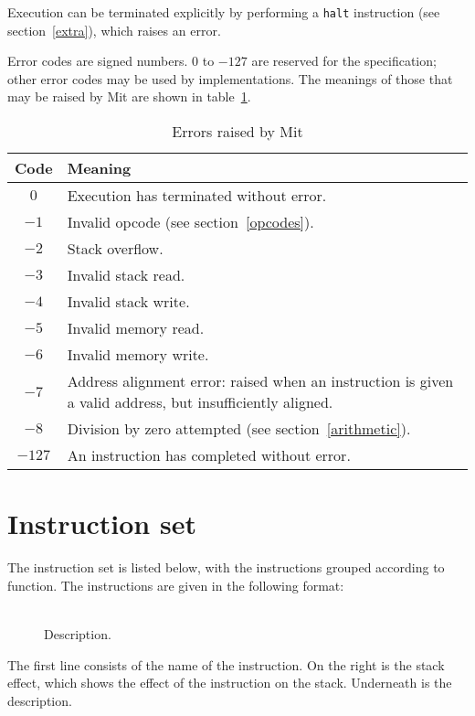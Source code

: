 \documentclass[a4paper]{article}
\newcommand{\spic}[1]{\texttt{\textsl{#1\/}}}
\newlength{\itemwidth}\itemwidth=\textwidth \advance\itemwidth by -0.1in
\newlength{\instname}\instname=1.5in
\newlength{\stackcom}\stackcom=3.0in
\newcommand{\inst}[3]{\item[]\parbox{\itemwidth}%
{\makebox[\instname][l]{\tt #1}%
\makebox[\stackcom][r]{\tt ( \spic{#2} )}\\[0.5ex]#3}}
\begin{document}
Execution can be terminated explicitly by performing a {\tt halt} instruction (see section~\ref{extra}), which raises an error.

Error codes are signed numbers. $0$ to $-127$ are reserved for the specification; other error codes may be used by implementations. The meanings of those that may be raised by Mit are shown in table~\ref{errortable}.

\begin{table}[htbp]
\begin{center}
\begin{tabular}{cp{4in}} \toprule
\bf Code & \bf Meaning \\ \midrule
$0$ & Execution has terminated without error. \\
$-1$ & Invalid opcode (see section~\ref{opcodes}). \\
$-2$ & Stack overflow. \\
$-3$ & Invalid stack read. \\
$-4$ & Invalid stack write. \\
$-5$ & Invalid memory read. \\
$-6$ & Invalid memory write. \\
$-7$ & Address alignment error: raised when an instruction is given a valid address, but insufficiently aligned. \\
$-8$ & Division by zero attempted (see section~\ref{arithmetic}). \\
$-127$ & An instruction has completed without error. \\
 \bottomrule
\end{tabular}
\caption{\label{errortable}Errors raised by Mit}
\end{center}
\end{table}


\section{Instruction set}
\label{instset}

The instruction set is listed below,
with the instructions grouped according to function. The
instructions are given in the following format:

\begin{description}
\inst{NAME}{before — after}{Description.}
\end{description}

The first line consists of the name of the instruction. On the right is the
stack effect, which shows the effect of the instruction on the stack.
Underneath is the description.
\end{document}
